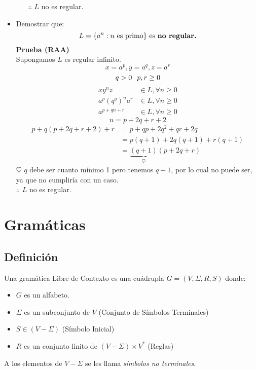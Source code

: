 \begin{itemize}
\begin{itemize}
	$\therefore$ $L$ no es regular.
\end{itemize}
\item Demostrar que:
	$$
	L =\{ a^n : n \text{ es primo} \} \text{ es \textbf{no regular.}}
	$$
	\textbf{Prueba (RAA)} \\${ }$\\
	Supongamos $L$ es regular infinito.
	$$ x=a^p ,y=a^q ,z=a^r $$
	$$q >0 \hspace{0.25cm} p,r\geq 0$$
	\begin{align*}
		xy^nz &\in L , \forall n\geq 0 \\
		a^p(q^q)^n a^r &\in L , \forall n\geq 0 \\
		a^{p+qn+r} &\in L , \forall n\geq 0 
	\end{align*}
	$$ n = p + 2q + r + 2$$
	\begin{align*}
		p+ q(p+2q+r+2)+r &= p + qp + 2q^2 +qr + 2q \\
				     &= p(q+1) + 2q(q+1) + r(q+1) \\
				     &= \underbrace{(q+1)}_{\heartsuit}(p+2q+r)
	\end{align*}
	$\heartsuit$ $q$ debe ser cuanto mínimo 1 pero tenemos $q+1$, por lo cual no puede ser, ya que no cumpliría con un caso. \\${ }$\\
	$\therefore$ $L$ no es regular.
\end{itemize}
\section{Gramáticas}
\subsection{Definición}
Una gramática Libre de Contexto es una cuádrupla $G=(V,\Sigma,R,S)$ donde:
\begin{itemize}
\item $G$ es un alfabeto.
\item  $\Sigma$ es un subconjunto de $V$ (Conjunto de Símbolos Terminales)
\item $S\in (V-\Sigma)$ (Símbolo Inicial)
\item $R$ es un conjunto finito de $(V-\Sigma)\times V^*$ (Reglas)
\end{itemize}

\begin{center}
\end{center}
A los elementos de $V-\Sigma$ se les llama \textit{símbolos no terminales}.
